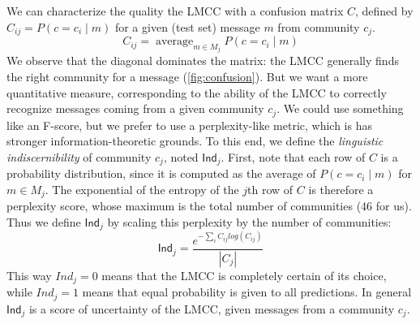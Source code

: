 \documentclass[11pt]{article}
\newcommand\Ind{\mathsf{Ind}}
\DeclareMathOperator*{\avg}{average}
\begin{document}
We can characterize the quality the LMCC with a confusion matrix
$C$, defined by $C_{ij} = P(c=c_i \mid m)$ for a given (test set) message $m$ 
from community $c_j$.
\[C_{ij} = \avg_{m\in M_j}P(c=c_i \mid m)\]
We observe that the diagonal dominates the matrix: the LMCC generally finds the right community for a message (\cref{fig:confusion}).
%
But we want a more quantitative measure, corresponding to the ability of the LMCC to correctly
recognize messages coming from a given community $c_j$. We could use
something like an F-score, but we prefer to use a perplexity-like metric,
which is has stronger information-theoretic grounds.
To this end, we define the \emph{linguistic indiscernibility} of community $c_j$, 
noted $\Ind_j$. 
First, note that each row of $C$ is a probability distribution,
since it is computed as the average of $P(c=c_i \mid m)$ for $m\in M_j$.
The exponential of the entropy of the $j$th row of \(C\) is therefore a perplexity score,
whose maximum is the total number of communities (46 for us).
Thus we define $\Ind_j$ by scaling this perplexity by the number of communities:
\[\Ind_j = \frac{e^{-\sum_i C_{ij} log(C_{ij})}}{|C_j|}\]
This way $Ind_j=0$ means that the LMCC is completely certain of its
choice, while $Ind_j=1$ means that equal probability is given to all
predictions.  In general $\Ind_j$ is a score of uncertainty of the
LMCC, given messages from a community $c_j$.
\end{document}
